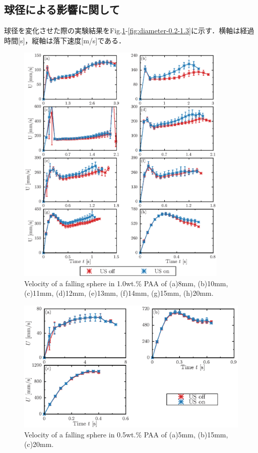 \clearpage

\subsection{球径による影響に関して}

球径を変化させた際の実験結果をFig.\ref{fig:diameter}-\ref{fig:diameter-0.2-1.3}に示す．横軸は経過時間[s]，縦軸は落下速度[m/s]である．

\begin{figure}[h]
    \centering
    \includegraphics[width=0.9\textwidth]{X-Appendix/diameter/diameter.eps}
    \caption{Velocity of a falling sphere in 1.0wt.\% PAA of (a)8mm, (b)10mm, (c)11mm, (d)12mm, (e)13mm, (f)14mm, (g)15mm, (h)20mm.}
    \label{fig:diameter}
\end{figure}

\begin{figure}[h]
    \centering
    \includegraphics[width=1\textwidth]{X-Appendix/diameter-0.5/diameter.eps}
    \caption{Velocity of a falling sphere in 0.5wt.\% PAA of (a)5mm, (b)15mm, (c)20mm.}
    \label{fig:diameter-0.5}
\end{figure}

